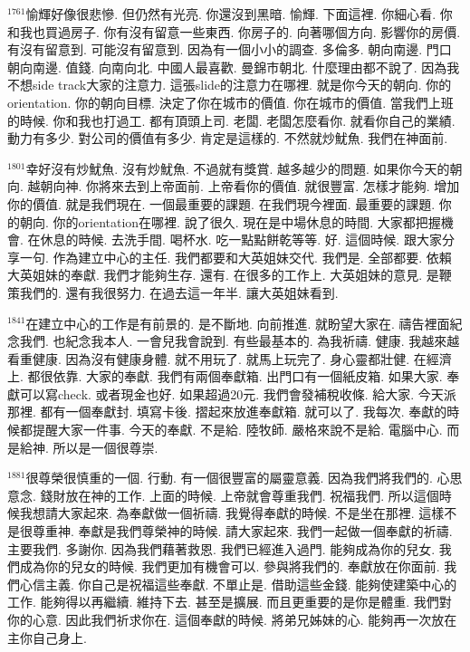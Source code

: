 \documentclass{book}
\begin{document}
$^{1761}$愉輝好像很悲慘.
但仍然有光亮.
你還沒到黑暗.
愉輝.
下面這裡.
你細心看.
你和我也買過房子.
你有沒有留意一些東西.
你房子的.
向著哪個方向.
影響你的房價.
有沒有留意到.
可能沒有留意到.
因為有一個小小的調查.
多倫多.
朝向南邊.
門口朝向南邊.
值錢.
向南向北.
中國人最喜歡.
曼錦市朝北.
什麼理由都不說了.
因為我不想side track大家的注意力.
這張slide的注意力在哪裡.
就是你今天的朝向.
你的orientation.
你的朝向目標.
決定了你在城市的價值.
你在城市的價值.
當我們上班的時候.
你和我也打過工.
都有頂頭上司.
老闆.
老闆怎麼看你.
就看你自己的業績.
動力有多少.
對公司的價值有多少.
肯定是這樣的.
不然就炒魷魚.
我們在神面前.

$^{1801}$幸好沒有炒魷魚.
沒有炒魷魚.
不過就有獎賞.
越多越少的問題.
如果你今天的朝向.
越朝向神.
你將來去到上帝面前.
上帝看你的價值.
就很豐富.
怎樣才能夠.
增加你的價值.
就是我們現在.
一個最重要的課題.
在我們現今裡面.
最重要的課題.
你的朝向.
你的orientation在哪裡.
說了很久.
現在是中場休息的時間.
大家都把握機會.
在休息的時候.
去洗手間.
喝杯水.
吃一點點餅乾等等.
好.
這個時候.
跟大家分享一句.
作為建立中心的主任.
我們都要和大英姐妹交代.
我們是.
全部都要.
依賴大英姐妹的奉獻.
我們才能夠生存.
還有.
在很多的工作上.
大英姐妹的意見.
是鞭策我們的.
還有我很努力.
在過去這一年半.
讓大英姐妹看到.

$^{1841}$在建立中心的工作是有前景的.
是不斷地.
向前推進.
就盼望大家在.
禱告裡面紀念我們.
也紀念我本人.
一會兒我會說到.
有些最基本的.
為我祈禱.
健康.
我越來越看重健康.
因為沒有健康身體.
就不用玩了.
就馬上玩完了.
身心靈都壯健.
在經濟上.
都很依靠.
大家的奉獻.
我們有兩個奉獻箱.
出門口有一個紙皮箱.
如果大家.
奉獻可以寫check.
或者現金也好.
如果超過20元.
我們會發補稅收條.
給大家.
今天派那裡.
都有一個奉獻封.
填寫卡後.
摺起來放進奉獻箱.
就可以了.
我每次.
奉獻的時候都提醒大家一件事.
今天的奉獻.
不是給.
陸牧師.
嚴格來說不是給.
電腦中心.
而是給神.
所以是一個很尊崇.

$^{1881}$很尊榮很慎重的一個.
行動.
有一個很豐富的屬靈意義.
因為我們將我們的.
心思意念.
錢財放在神的工作.
上面的時候.
上帝就會尊重我們.
祝福我們.
所以這個時候我想請大家起來.
為奉獻做一個祈禱.
我覺得奉獻的時候.
不是坐在那裡.
這樣不是很尊重神.
奉獻是我們尊榮神的時候.
請大家起來.
我們一起做一個奉獻的祈禱.
主要我們.
多謝你.
因為我們藉著救恩.
我們已經進入過門.
能夠成為你的兒女.
我們成為你的兒女的時候.
我們更加有機會可以.
參與將我們的.
奉獻放在你面前.
我們心信主義.
你自己是祝福這些奉獻.
不單止是.
借助這些金錢.
能夠使建築中心的工作.
能夠得以再繼續.
維持下去.
甚至是擴展.
而且更重要的是你是體重.
我們對你的心意.
因此我們祈求你在.
這個奉獻的時候.
將弟兄姊妹的心.
能夠再一次放在主你自己身上.
\end{document}
